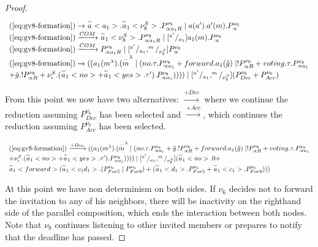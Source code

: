 \begin{proof}
\[
\begin{array}{l} 
	(\ref{eq:gv8-formation})\rightarrow  \overset{-}{a}<a_1>.\overset{-}{a}_1<\nu_8^S>.P^{\nu_8}_{\propto a_1R} \mid a(a^\prime).a^\prime(m).P^{\nu_6}_\propto\\
	(\ref{eq:gv8-formation})\xrightarrow{COM} \overset{-}{a}_1<\nu_8^S>.P^{\nu_8}_{\propto a_1R} \mid [^{a^\prime}/_{a_1}]a_1(m).P^{\nu_6}_\propto\\
	(\ref{eq:gv8-formation})\xrightarrow{COM} P^{\nu_8}_{\propto a_1R} \mid [^{a^\prime}/_{a_1}, ^m/_{\nu_8^S}]P^{\nu_6}_\propto\\
	(\ref{eq:gv8-formation})\xrightarrow{} ((a_1(m^\lambda).(\overset{-}{m}^\lambda\mid (no.\tau.P^{\nu_8}_{\propto a_1} + forward.a_1(\hat{g})\mid !P^{\nu_8}_{\propto R} + voting.\tau.P^{\nu_8}_{\propto a_1}\\  + \hat{g}.!P^{\nu_8}_{\propto R}  + \nu_\imath^S.(\overset{-}{a}_1<no> + \overset{-}{a}_1<yes>.\tau^\prime).P^{\nu_8}_{\propto a_1})))) \mid [^{a^\prime}/_{a_1}, ^m/_{\nu_8^S}] (P^{\nu_6}_{Dec} + P^{\nu_6}_{Acc})\\
\end{array} 
\]

From this point we now have two alternatives: $\xrightarrow{+Dec}$ where we continue the reduction assuming
$P^{\nu_6}_{Dec}$ has been selected and $\xrightarrow{+Acc}$, which continues the reduction assuming $P^{\nu_6}_{Acc}$
has been selected.

\[
\begin{array}{l}
	(\ref{eq:gv8-formation})\xrightarrow{+Dec} ((a_1(m^\lambda).(\overset{-}{m}^\lambda\mid (no.\tau.P^{\nu_8}_{\propto a_1} + \hat{g}.!P^{\nu_8}_{\propto R} + forward.a_1(\hat{g})\mid !P^{\nu_8}_{\propto R} + voting.\tau.P^{\nu_8}_{\propto a_1}\\ + \nu_\imath^S.(\overset{-}{a}_1<no> + \overset{-}{a}_1<yes>.\tau^\prime).P^{\nu_8}_{\propto a_1})))) \mid [^{a^\prime}/_{a_1}, ^m/_{\nu_8^S}] (\overset{-}{a}_1<no>.0 +\\ \overset{-}{a}_1<forward>(\overset{-}{a}_1<c_1d_1>.(P^{\nu_6}_{For5}\mid P^{\nu_6}_{For9}) + (\overset{-}{a}_1<d_1>.P^{\nu_6}_{For5} + \overset{-}{a}_1<c_1>.P^{\nu_6}_{For9})))\\
\end{array}
\]

At this point we have non determinism on both sides. If $\nu_6$ decides not to forward the invitation to any of his
neighbors, there will be inactivity on the righthand side of the parallel composition, which ends the interaction between
both nodes. Note that $\nu_8$ continues listening to other invited members or prepares to notify that the deadline has
passed.


\end{proof}
